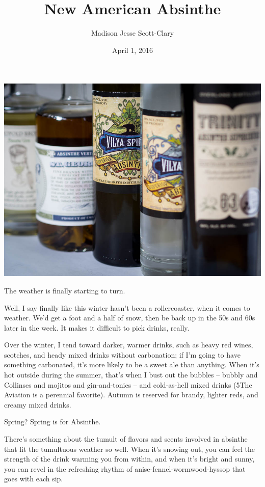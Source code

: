 \documentclass[12pt,letterpaper,oneside]{memoir}
\title{New American Absinthe}
\author{Madison Jesse Scott-Clary}
\date{April 1, 2016}
\begin{document}
  \maketitle

  \noindent\includegraphics[width=\linewidth]{../../assets/tasting/naa-all.jpg}

  The weather is finally starting to turn.

  Well, I say finally like this winter hasn't been a rollercoaster, when it comes to weather.  We'd get a foot and a half of snow, then be back up in the 50s and 60s later in the week.  It makes it difficult to pick drinks, really.

  Over the winter, I tend toward darker, warmer drinks, such as heavy red wines, scotches, and heady mixed drinks without carbonation; if I'm going to have something carbonated, it's more likely to be a sweet ale than anything.  When it's hot outside during the summer, that's when I bust out the bubbles -- bubbly and Collinses and mojitos and gin-and-tonics -- and cold-as-hell mixed drinks (5The Aviation is a perennial favorite).  Autumn is reserved for brandy, lighter reds, and creamy mixed drinks.

  Spring?  Spring is for Absinthe.

  There's something about the tumult of flavors and scents involved in absinthe that fit the tumultuous weather so well.  When it's snowing out, you can feel the strength of the drink warming you from within, and when it's bright and sunny, you can revel in the refreshing rhythm of anise-fennel-wormwood-hyssop that goes with each sip.
\end{document}
